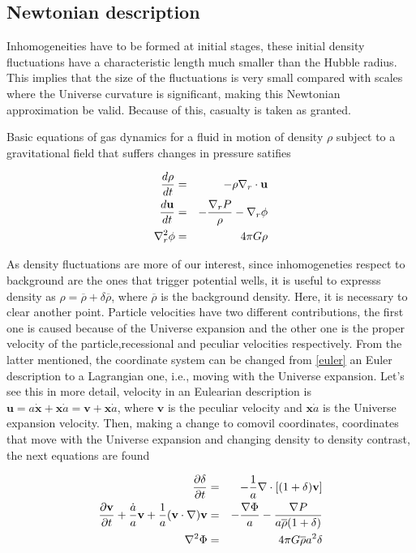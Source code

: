 \subsection{ Newtonian description  }


Inhomogeneities have to be formed at initial stages, these initial density fluctuations 
have a characteristic length much smaller than the Hubble radius. This implies that the
size of the fluctuations is very small compared with scales where the Universe curvature 
is significant, making this Newtonian approximation be valid. Because of this, casualty 
is taken as granted.

Basic equations of gas dynamics for a fluid in motion of density $\rho$ 
subject to a gravitational field that suffers changes in pressure satifies 

\begin{eqnarray}
\frac{d \rho}{d t}&=& -\rho \nabla_r\cdot \textbf{u} \nonumber\\
\frac{d \textbf{u}}{d t} &=& -\frac{\nabla_r P}{\rho}-\nabla_r\phi \nonumber\\
\nabla^2_r \phi & =& 4\pi G\rho 
\label{euler}
\end{eqnarray}

As density fluctuations are more of our interest, since inhomogeneties 
respect to background are the ones that trigger potential wells, it is
useful to expresss density as $\rho = \overline{\rho}+\delta\overline{\rho}$, where
$\overline{\rho}$ is the background density. 
Here, it is necessary to clear another point. Particle velocities have 
two different contributions, the first one is caused because of the Universe
expansion and the other one is the proper velocity of the particle,recessional 
and peculiar velocities respectively. 
From the latter mentioned, the coordinate system can be changed from \ref{euler}
an Euler description to a Lagrangian one, i.e., moving with the Universe expansion.
Let's see this in more detail, velocity in an Eulearian description is 
$\textbf{u}= a\dot{\textbf{x}}+ \textbf{x}\dot{a} = \textbf{v}+\textbf{x}\dot{a}$, 
where $\textbf{v}$ is the peculiar velocity and $\textbf{x}\dot{a}$ is the Universe 
expansion velocity. 
Then, making a change to comovil coordinates, coordinates that move with the Universe
expansion and changing density to density contrast, the next equations are found

\begin{eqnarray}
\frac{\partial \delta}{\partial t} &=& -\frac{1}{a}\nabla\cdot[(1+\delta)\textbf{v}]\nonumber\\
\frac{\partial \textbf{v}}{\partial t}+\frac{\dot{a}}{a}\textbf{v}+\frac{1}{a}(\textbf{v}\cdot\nabla)\textbf{v}& = &
-\frac{\nabla \Phi}{a}-\frac{\nabla P}{a\overline{\rho}(1+\delta)}\nonumber\\
\nabla^2 \Phi &=& 4\pi G\overline{\rho}a^2\delta
\label{ec.movimiento}
\end{eqnarray}

